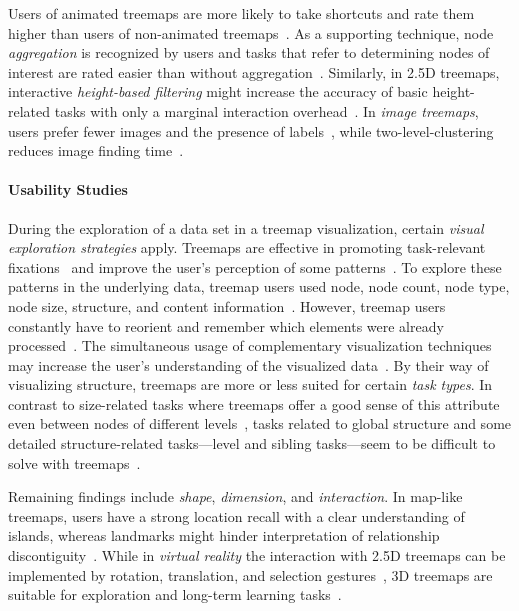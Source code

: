 \documentclass[sigconf,
natbib=true]{acmart}
\begin{document}
Users of animated treemaps are more likely to take shortcuts and rate them higher than users of non-animated treemaps~\cite{bladh2005-transitions}.
As a supporting technique, node \emph{aggregation} is recognized by users and tasks that refer to determining nodes of interest are rated easier than without aggregation~\cite{limberger2017-aggregation}.
Similarly, in 2.5D treemaps, interactive \emph{height-based filtering} might increase the accuracy of basic height-related tasks with only a marginal interaction overhead~\cite{limberger2018-filtering}.
In \emph{image treemaps}, users prefer fewer images and the presence of labels~\cite{guerra-gomez2016-photo}, while two-level-clustering reduces image finding time~\cite{gomi2008-imagebrowser}.

\paragraph{\textbf{Usability Studies}}
During the exploration of a data set in a treemap visualization, certain \emph{visual exploration strategies} apply.
Treemaps are effective in promoting task-relevant fixations~\cite{mueller2017-perception} and improve the user's perception of some patterns~\cite{wang2006-knowledgediscovery}.
To explore these patterns in the underlying data, treemap users used node, node count, node type, node size, structure, and content information~\cite{wang2006-knowledgediscovery}.
However, treemap users constantly have to reorient and remember which elements were already processed~\cite{mueller2017-perception}.
The simultaneous usage of complementary visualization techniques may increase the user's understanding of the visualized data~\cite{teoh2007-multipleviews}.
By their way of visualizing structure, treemaps are more or less suited for certain \emph{task types}.
In contrast to size-related tasks where treemaps offer a good sense of this attribute even between nodes of different levels~\cite{teoh2007-multipleviews}, tasks related to global structure and some detailed structure-related tasks---level and sibling tasks---seem to be difficult to solve with treemaps~\cite{kobsa2004-systems}.
\par
Remaining findings include \emph{shape}, \emph{dimension}, and \emph{interaction}.
In map-like treemaps, users have a strong location recall with a clear understanding of islands, whereas landmarks might hinder interpretation of relationship discontiguity~\cite{hawes2015-codesurveyor}.
While in \emph{virtual reality} the interaction with 2.5D treemaps can be implemented by rotation, translation, and selection gestures~\cite{fittkau2015-virtualreality}, 3D treemaps are %
suitable for exploration and long-term learning tasks~\cite{wiss1999-tasksupport}.
\end{document}
